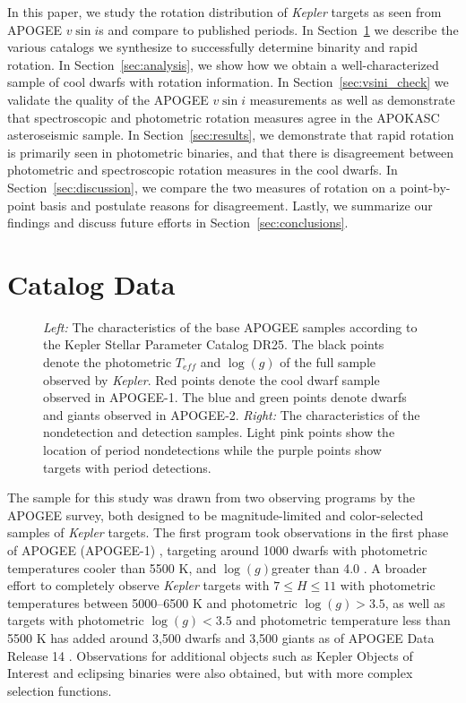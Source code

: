 \documentclass[manuscript]{aastex6}
\newcommand{\vsini}{\ensuremath{v \sin i}}
\newcommand{\Kepler}{\mbox{\textit{Kepler}}}
\newcommand{\Teff}{\ensuremath{T_{eff}}}
\newcommand{\logg}{\ensuremath{\log(g)}}
\begin{document}
In this paper, we study the rotation distribution of \Kepler{} targets as
seen from APOGEE \vsini{}s and compare to published periods. In 
Section~\ref{sec:data} we describe the various catalogs we synthesize to
successfully determine binarity and rapid rotation.
In Section~\ref{sec:analysis}, we show how we obtain a well-characterized
sample of cool dwarfs with rotation information. In
Section~\ref{sec:vsini_check} we validate the quality of the APOGEE \vsini{}
measurements as well as demonstrate that spectroscopic and photometric rotation
measures agree in the 
APOKASC asteroseismic sample. In Section~\ref{sec:results}, we demonstrate that
rapid rotation is primarily seen in photometric binaries, and that there is
disagreement between photometric and spectroscopic rotation measures in the
cool dwarfs. In Section~\ref{sec:discussion}, we compare the two measures of 
rotation on a point-by-point basis and postulate reasons for disagreement. 
Lastly, we summarize our findings and discuss future efforts in 
Section~\ref{sec:conclusions}.

\section{Catalog Data}
\label{sec:data}

\begin{figure}[htb]
    \caption{\emph{Left: } The characteristics of the base APOGEE samples 
        according to the Kepler Stellar Parameter Catalog DR25. The
    black points denote the photometric \Teff{} and \logg{} of the full
    sample observed by \Kepler{}. Red points denote the cool dwarf sample 
    observed in APOGEE-1. The blue and green points denote dwarfs and giants 
 observed in APOGEE-2. \emph{Right: } The characteristics of the
 \citet{McQuillan14} nondetection and detection samples. Light pink points show
 the location of period nondetections while the purple points show targets with 
 period detections.}\label{fig:selection}
\end{figure}

The sample for this study was drawn from two observing programs by the APOGEE
survey, both designed to be magnitude-limited and color-selected samples of
\Kepler{} targets. The first program took observations in the first phase of
APOGEE (APOGEE-1) \citep{Majewski15}, targeting around 1000  dwarfs
with photometric temperatures cooler than 5500 K, and \logg greater than 4.0
\citep{Brown11,Pinsonneault12}. A broader effort to completely observe
\Kepler{} targets with \(7 \le H \le 11\) with photometric temperatures between
5000--6500 K and photometric \(\logg > 3.5\), as well as targets with
photometric \(\logg < 3.5\) and photometric temperature less than 5500 K  
\citep{Pinsonneault12,Huber14} has added around 3,500 dwarfs and 3,500 giants 
as of APOGEE Data Release 14 \citep{Zasowski17}. Observations for additional 
objects such as Kepler Objects of Interest  and eclipsing binaries were also 
obtained, but with more complex selection functions.
\end{document}
